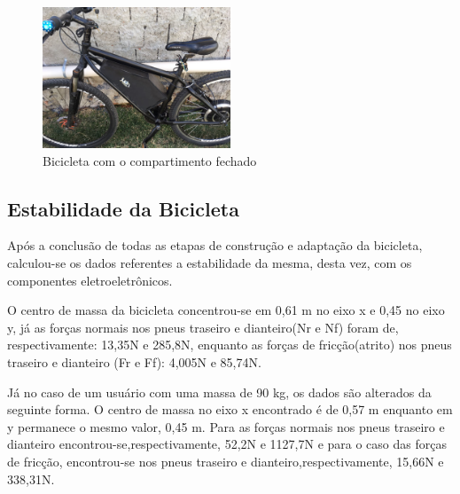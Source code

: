 	\graphicspath{{figuras/}}	
	\begin{figure}[H]
		\centering
		\includegraphics[width=0.5\textwidth]{box_fechada2.jpg}
		\caption{Bicicleta com o compartimento fechado}
		\label{img:box_fechada2}
	\end{figure}

		
	\subsection{Estabilidade da Bicicleta}
	Após a conclusão de todas as etapas de construção e adaptação da bicicleta, calculou-se os dados referentes a estabilidade da mesma, desta vez, com os componentes eletroeletrônicos.
	
	O centro de massa da bicicleta concentrou-se em 0,61 m no eixo x e 0,45 no eixo y, já as forças normais nos pneus traseiro e dianteiro(Nr e Nf) foram de, respectivamente: 13,35N e 285,8N, enquanto as forças de fricção(atrito) nos pneus traseiro e dianteiro (Fr e Ff): 4,005N e 85,74N.
	
	Já no caso de um usuário com uma massa de 90 kg, os dados são alterados da seguinte forma. O centro de massa no eixo x encontrado é de 0,57 m enquanto em y permanece o mesmo valor, 0,45 m. Para as forças normais nos pneus traseiro e dianteiro encontrou-se,respectivamente, 52,2N e 1127,7N e para o caso das forças de fricção, encontrou-se nos pneus traseiro e dianteiro,respectivamente, 15,66N e 338,31N.
	
